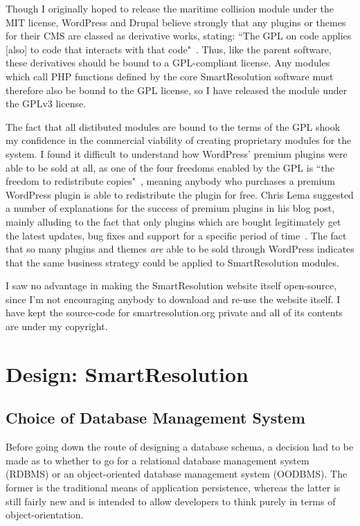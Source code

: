 Though I originally hoped to release the maritime collision module under the MIT license, WordPress and Drupal believe strongly that any plugins or themes for their CMS are classed as derivative works, stating: ``The GPL on code applies [also] to code that interacts with that code"~\cite{wordpress:gpl}. Thus, like the parent software, these derivatives should be bound to a GPL-compliant license. Any modules which call PHP functions defined by the core SmartResolution software must therefore also be bound to the GPL license, so I have released the module under the GPLv3 license.

The fact that all distibuted modules are bound to the terms of the GPL shook my confidence in the commercial viability of creating proprietary modules for the system. I found it difficult to understand how WordPress' premium plugins were able to be sold at all, as one of the four freedoms enabled by the GPL is ``the freedom to redistribute copies"~\cite{fourFreedoms}, meaning anybody who purchases a premium WordPress plugin is able to redistribute the plugin for free. Chris Lema suggested a number of explanations for the success of premium plugins in his blog post, mainly alluding to the fact that only plugins which are bought legitimately get the latest updates, bug fixes and support for a specific period of time~\cite{chrisLema}. The fact that so many plugins and themes \emph{are} able to be sold through WordPress indicates that the same business strategy could be applied to SmartResolution modules.

I saw no advantage in making the SmartResolution website itself open-source, since I'm not encouraging anybody to download and re-use the website itself. I have kept the source-code for smartresolution.org private and all of its contents are under my copyright.

\section{Design: SmartResolution}

\subsection{Choice of Database Management System}

Before going down the route of designing a database schema, a decision had to be made as to whether to go for a relational database management system (RDBMS) or an object-oriented database management system (OODBMS). The former is the traditional means of application persistence, whereas the latter is still fairly new and is intended to allow developers to think purely in terms of object-orientation.

